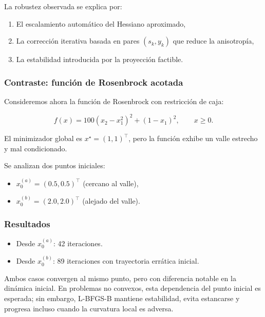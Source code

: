 \documentclass[
  spanish,
  us-letterpaper,
  DIV=11,
  numbers=noendperiod]{scrreprt}
\providecommand{\tightlist}{%
  \setlength{\itemsep}{0pt}\setlength{\parskip}{0pt}}
\numberwithin{equation}{section}
\begin{document}
La robustez observada se explica por:

\begin{enumerate}
\def\labelenumi{\arabic{enumi}.}
\tightlist
\item
  El escalamiento automático del Hessiano aproximado,
\item
  La corrección iterativa basada en pares \((s_k, y_k)\) que reduce la
  anisotropía,
\item
  La estabilidad introducida por la proyección factible.
\end{enumerate}

\subsubsection{Contraste: función de Rosenbrock
acotada}\label{contraste-funciuxf3n-de-rosenbrock-acotada}

Consideremos ahora la función de Rosenbrock con restricción de caja:

\[
f(x) = 100(x_2 - x_1^2)^2 + (1 - x_1)^2,
\qquad
x \ge 0.
\]

El minimizador global es \(x^\star = (1,1)^\top\), pero la función
exhibe un valle estrecho y mal condicionado.

Se analizan dos puntos iniciales:

\begin{itemize}
\tightlist
\item
  \(x_0^{(a)} = (0.5,0.5)^\top\) (cercano al valle),
\item
  \(x_0^{(b)} = (2.0,2.0)^\top\) (alejado del valle).
\end{itemize}

\subsubsection{Resultados}\label{resultados}

\begin{itemize}
\tightlist
\item
  Desde \(x_0^{(a)}\): 42 iteraciones.
\item
  Desde \(x_0^{(b)}\): 89 iteraciones con trayectoria errática inicial.
\end{itemize}

Ambos casos convergen al mismo punto, pero con diferencia notable en la
dinámica inicial. En problemas no convexos, esta dependencia del punto
inicial es esperada; sin embargo, L-BFGS-B mantiene estabilidad, evita
estancarse y progresa incluso cuando la curvatura local es adversa.
\end{document}

